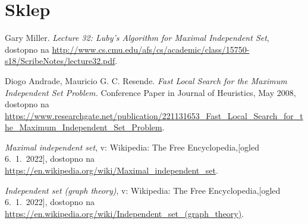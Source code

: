 \documentclass[a4paper, 12pt]{article}
\begin{document}
\section{Sklep}

\newpage

\begin{thebibliography}{9}    

    Gary Miller.
    \textit{Lecture 32: Luby’s Algorithm for Maximal Independent Set}, dostopno na \url{http://www.cs.cmu.edu/afs/cs/academic/class/15750-s18/ScribeNotes/lecture32.pdf}.

    Diogo Andrade, Mauricio G. C. Resende.
    \textit{Fast Local Search for the Maximum Independent Set Problem.} Conference Paper in Journal of Heuristics, May 2008, 
    dostopno na \url{https://www.researchgate.net/publication/221131653_Fast_Local_Search_for_the_Maximum_Independent_Set_Problem}.

    \textit{Maximal independent set}, v: Wikipedia: The Free Encyclopedia,[ogled 6.~1.~2022], dostopno na \url{https://en.wikipedia.org/wiki/Maximal_independent_set}.

    \textit{Independent set (graph theory)}, v: Wikipedia: The Free Encyclopedia,[ogled 6.~1.~2022], dostopno na \url{https://en.wikipedia.org/wiki/Independent_set_(graph_theory)}.

    
\end{thebibliography}
\end{document}
